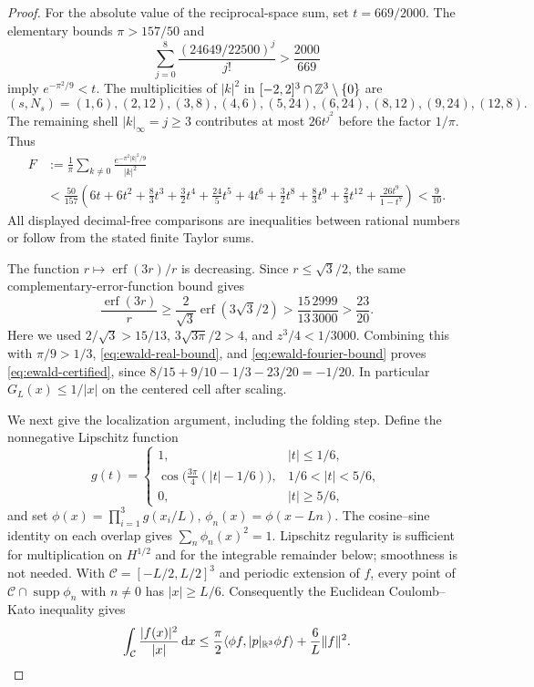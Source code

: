 \begin{proof}
For the absolute value of the reciprocal-space sum, set $t=669/2000$.
The elementary bounds $\pi>157/50$ and
\[
 \sum_{j=0}^8\frac{(24649/22500)^j}{j!}>\frac{2000}{669}
\]
imply $e^{-\pi^2/9}<t$.  The multiplicities of $|k|^2$ in
$[-2,2]^3\cap\mathbb Z^3\setminus\{0\}$ are
\[
 (s,N_s)=(1,6),(2,12),(3,8),(4,6),(5,24),
          (6,24),(8,12),(9,24),(12,8).
\]
The remaining shell $|k|_\infty=j\ge3$ contributes at most $26t^{j^2}$
before the factor $1/\pi$.  Thus
\begin{align}
 F&:=\frac1\pi\sum_{k\ne0}\frac{e^{-\pi^2|k|^2/9}}{|k|^2}\nonumber\\
 &<\frac{50}{157}\left(
 6t+6t^2+\frac83t^3+\frac32t^4+\frac{24}{5}t^5+4t^6
 +\frac32t^8+\frac83t^9+\frac23t^{12}
 +\frac{26t^9}{1-t^7}\right)<\frac9{10}.
 \label{eq:ewald-fourier-bound}
\end{align}
All displayed decimal-free comparisons are inequalities between rational
numbers or follow from the stated finite Taylor sums.

The function $r\mapsto\operatorname{erf}(3r)/r$ is decreasing.  Since
$r\le\sqrt3/2$, the same complementary-error-function bound gives
\[
 \frac{\operatorname{erf}(3r)}r
 \ge\frac2{\sqrt3}\operatorname{erf}(3\sqrt3/2)
 >\frac{15}{13}\frac{2999}{3000}>\frac{23}{20}.
\]
Here we used $2/\sqrt3>15/13$,
$3\sqrt{3\pi}/2>4$, and $z^3/4<1/3000$.
Combining this with $\pi/9>1/3$,
\eqref{eq:ewald-real-bound}, and \eqref{eq:ewald-fourier-bound} proves
\eqref{eq:ewald-certified}, since
$8/15+9/10-1/3-23/20=-1/20$.  In particular
$G_L(x)\le1/|x|$ on the centered cell after scaling.

We next give the localization argument, including the folding step.  Define
the nonnegative Lipschitz function
\[
 g(t)=\begin{cases}
 1,&|t|\le1/6,\\
 \cos\bigl(\frac{3\pi}4(|t|-1/6)\bigr),&1/6<|t|<5/6,\\
 0,&|t|\ge5/6,
 \end{cases}
\]
and set $\phi(x)=\prod_{i=1}^3g(x_i/L)$,
$\phi_n(x)=\phi(x-Ln)$.  The cosine--sine identity on each overlap gives
$\sum_n\phi_n(x)^2=1$.  Lipschitz regularity is sufficient for multiplication
on $H^{1/2}$ and for the integrable remainder below; smoothness is not needed.
With $\mathcal C=[-L/2,L/2]^3$ and periodic extension of $f$, every point of
$\mathcal C\cap\operatorname{supp}\phi_n$ with $n\ne0$ has $|x|\ge L/6$.
Consequently the Euclidean Coulomb--Kato inequality gives
\begin{equation}
 \int_{\mathcal C}\frac{|f(x)|^2}{|x|}\,\mathrm d x
 \le\frac\pi2\langle\phi f,|p|_{\mathbb R^3}\phi f\rangle
       +\frac6L\|f\|^2.
 \label{eq:pkato-local}
\end{equation}


\end{proof}

